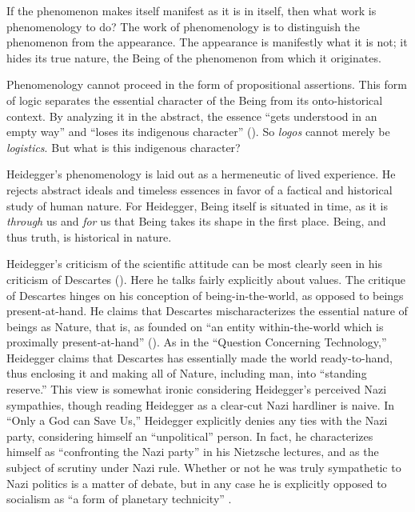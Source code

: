 \documentclass[leqno, 12pt]{turabian-researchpaper}
\begin{document}
	If the phenomenon makes itself manifest as it is in itself, then what work is
	phenomenology to do? The work of phenomenology is to distinguish the phenomenon
	from the appearance. The appearance is manifestly what it is not; it hides its
	true nature, the Being of the phenomenon from which it originates.

	Phenomenology cannot proceed in the form of propositional assertions. This form
	of logic separates the essential character of the Being from its onto-historical
	context. By analyzing it in the abstract, the essence \enquote{gets understood in an empty way}
	and \enquote{loses its indigenous character} ().
	So \emph{logos} cannot merely be \emph{logistics}. But what is this indigenous
	character?

	Heidegger's phenomenology is laid out as a hermeneutic of lived experience. He
	rejects abstract ideals and timeless essences in favor of a factical and
	historical study of human nature. For Heidegger, Being itself is situated in
	time, as it is \emph{through} us and \emph{for} us that Being takes its shape in
	the first place. Being, and thus truth, is historical in nature.


	Heidegger's criticism of the scientific attitude can be most clearly seen in his
	criticism of Descartes (). Here
	he talks fairly explicitly about values. The critique of Descartes hinges on his
	conception of being-in-the-world, as opposed to beings present-at-hand. He claims
	that Descartes mischaracterizes the essential nature of beings as Nature, that
	is, as founded on \enquote{an entity within-the-world which is proximally present-at-hand}
	(). As in the \enquote{Question Concerning Technology,}
	\nocite{heidegger2008c} Heidegger claims that Descartes has essentially made the
	world ready-to-hand, thus enclosing it and making all of Nature, including man,
	into \enquote{standing reserve.} This view is somewhat ironic considering Heidegger's
	perceived Nazi sympathies, though reading Heidegger as a clear-cut Nazi
	hardliner is naive. In \enquote{Only a God can Save Us,} Heidegger explicitly
	denies any ties with the Nazi party, considering himself an \enquote{unpolitical}
	person. In fact, he characterizes himself as \enquote{confronting the Nazi party}
	in his Nietzsche lectures, and as the subject of scrutiny under Nazi rule. Whether
	or not he was truly sympathetic to Nazi politics is a matter of debate, but in
	any case he is explicitly opposed to socialism as \enquote{a form of planetary technicity}
	\autocite[206]{heidegger1981}.
\end{document}
